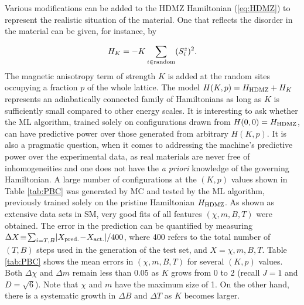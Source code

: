 \documentclass[reprint,amsmath,amssymb,aps,showpacs,superscriptaddress,prl]{revtex4-1}
\newcommand{\ba}{\begin{eqnarray}}
\newcommand{\ea}{\end{eqnarray}}
\begin{document}


Various modifications can be added to the HDMZ Hamiltonian (\ref{eq:HDMZ}) to represent the realistic situation of the material. One that reflects the disorder in the material can be given, for instance, by~\cite{skyrmion-book,jiang-review,fert-review}

\ba H_{K} = -K \sum_{i \in {\rm random}} (S^z_i )^2 . \ea
The magnetic anisotropy term of strength $K$ is added at the random sites occupying a fraction $p$ of the whole lattice. The model $H(K,p) = H_{\rm HDMZ} + H_K$ represents an adiabatically connected family of Hamiltonians as long as $K$ is sufficiently small compared to other energy scales. It is interesting to ask whether the ML algorithm, trained solely on  configurations drawn from $H(0,0)= H_{\rm HDMZ}$, can have predictive power over those generated from arbitrary $H(K,p)$. It is also a pragmatic question, when it comes to addressing the machine's predictive power over the experimental data, as real materials are never free of inhomogeneities and one does not have the {\it a priori} knowledge of the governing Hamiltonian. A large number of configurations at the $(K,p)$ values shown in Table \ref{tab:PBC} was generated by MC and tested by the ML algorithm, previously  trained solely on the pristine Hamiltonian $H_{\rm HDMZ}$. As shown as extensive data sets in SM, very good fits of all features $(\chi, m, B, T)$ were obtained. The error in the prediction can be quantified by measuring $\Delta X \! \equiv \!  \sum_{i=T,B} \! | X_{\rm pred.} \! - \! X_{\rm act.} | / 400 $, where 400 refers to the total number of $(T,B)$ steps used in the generation of the test set, and $X=\chi, m, B, T$. Table \ref{tab:PBC} shows the mean errors in $(\chi, m, B, T)$ for several $(K,p)$ values. Both $\Delta \chi$ and $\Delta m$ remain less than 0.05 as $K$ grows from 0 to 2 (recall $J=1$ and $D=\sqrt{6}$). Note that $\chi$ and $m$ have the maximum size of 1. On the other hand, there is a systematic growth in $\Delta B$ and $\Delta T$ as $K$ becomes larger.
\end{document}

